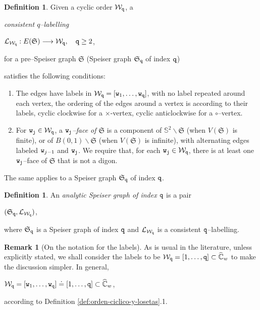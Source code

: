 \documentclass[final,3p,times]{elsarticle}
\newcommand{\CW}{\ensuremath{{\widehat{\mathbb C}}}}
\newcommand{\esf}{\ensuremath{{\mathbb S}^2}}
\theoremstyle{definition}
\newtheorem{definition}[theorem]{Definition}
\newtheorem{remark}[theorem]{Remark}
\begin{document}
\begin{definition}
\label{def:etiquetado-consistente-Speiser}
Given a cyclic order $\mathcal{W}_{\tt q}$, 
a {\it consistent $q$--labelling 

\centerline{$\mathcal{L}_{\mathcal{W}_{\tt q}}: E(\mathfrak{S}) \longrightarrow \mathcal{W}_{\tt q}, 
\ \ \
{\tt q} \geq 2$, } 

\noindent 
for a pre--Speiser graph $\mathfrak{S}$ (Speiser graph $\mathfrak{S}_{\tt q}$ of index $\tt q$)} 
satisfies the following conditions:
\begin{enumerate}[label=\roman*),leftmargin=*]
\item 
The edges have labels 
in $\mathcal{W}_{\tt q}=[{\tt w}_1, \ldots, {\tt w}_{\tt q} ]$,
with no label repeated around each vertex,
the ordering of the edges around a vertex is according to their labels, 
cyclic clockwise for a $\times$-vertex, cyclic anticlockwise for a $\circ$--vertex.

\item
For ${\tt w}_{\tt j} \in \mathcal{W}_{\tt q}$, 
a \emph{${\tt w}_{\tt j}$--face of $\mathfrak{S}$} is a component of 
$\esf \backslash \mathfrak{S}$ (when $V(\mathfrak{S})$ is finite), or 
of $B(0,1) \backslash \mathfrak{S}$ (when $V(\mathfrak{S})$ is infinite),
with alternating edges labeled ${\tt w}_{j-1}$ and ${\tt w}_{\tt j}$.
We require that, for each ${\tt w}_{\tt j}\in\mathcal{W}_{\tt q}$, 
there is at least one ${\tt w}_{\tt j}$--face of $\mathfrak{S}$ 
that is not a digon. 
\end{enumerate}


\noindent 
The same applies to a Speiser graph 
$\mathfrak{S}_{\tt q}$ of index $\tt q$.
\end{definition}

\begin{definition}
\label{def:analytic-Speiser-graph}
An \emph{analytic Speiser graph of index $\tt q$} is a pair

\centerline{$(\mathfrak{S}_{\tt q}, \mathcal{L}_{\mathcal{W}_{\tt q}})$,}

\noindent
where $\mathfrak{S}_{\tt q}$ is a Speiser graph of index $\tt q$ and
$\mathcal{L}_{\mathcal{W}_{\tt q}}$ is a consistent 
$\tt q$--labelling.
\end{definition}

\begin{remark}[On the notation for the labels]
\label{rem:notation-of-labels}
As is usual in the literature, unless explicitly stated, 
we shall consider the labels to be 
$\mathcal{W}_{\tt q}=[{1},\ldots,{\tt q}]\subset\CW_w$ 
to make the discussion simpler.
In general,
  
\centerline{$\mathcal{W}_{\tt q}=
[{\tt w}_1, \ldots , {\tt w}_{\tt q}]
\doteq
[1, \ldots, {\tt q}]\subset\CW_w$, }

\noindent 
according to Definition \ref{def:orden-ciclico-y-losetas}.1.
\end{remark}
\end{document}
